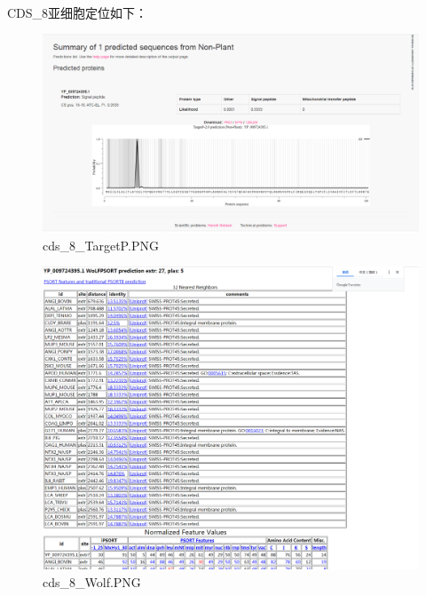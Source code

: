 \documentclass[supercite]{HustGraduPaper}
\begin{document}
	\paragraph{}\label{subpara:subpara}CDS\_8亚细胞定位如下：
	\begin{figure}[H]
		\centering
		\includegraphics[width=1\textwidth]{./material/practice2/cds_8/TargetP.png}
		\caption{cds\_8\_TargetP.PNG}
	\end{figure}
	\begin{figure}[H]
		\centering
		\includegraphics[width=1\textwidth]{./material/practice2/cds_8/wolf.png}
		\caption{cds\_8\_Wolf.PNG}
  \end{figure}
\end{document}
